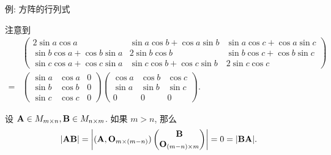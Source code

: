 \begin{frame}{例: 方阵的行列式}
	\onslide<+->
	\begin{answer}
		注意到
		\begin{align*}
			&\begin{pmatrix}
			2\sin a\cos a&\sin a\cos b+\cos a\sin b&\sin a\cos c+\cos a\sin c\\
			\sin b\cos a+\cos b\sin a&2\sin b\cos b&\sin b\cos c+\cos b\sin c\\
			\sin c\cos a+\cos c\sin a&\sin c\cos b+\cos c\sin b&2\sin c\cos c
		\end{pmatrix}\\=&\begin{pmatrix}
			\sin a&\cos a&0\\
			\sin b&\cos b&0\\
			\sin c&\cos c&0
		\end{pmatrix}\begin{pmatrix}
			\cos a&\cos b&\cos c\\
			\sin a&\sin b&\sin c\\
			0&0&0
		\end{pmatrix}.
	\end{align*}
	\end{answer}
	\onslide<+->
	设 ${\mathbf{A}}\in M_{m\times n},{\mathbf{B}}\in M_{n\times m}$.
	\onslide<+->
	如果 $m>n$, 那么
	\[|{\mathbf{A}}{\mathbf{B}}|=\left|\begin{matrix}({\mathbf{A}},{\mathbf{O}}_{m\times(m-n)})\begin{pmatrix}
		{\mathbf{B}}\\{\mathbf{O}}_{(m-n)\times m}
	\end{pmatrix}\end{matrix}\right|=0=|{\mathbf{B}}{\mathbf{A}}|.\]
\end{frame}

